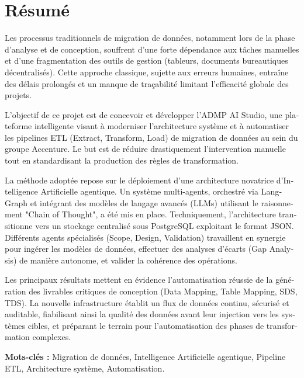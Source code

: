 \section*{Résumé}


\begin{otherlanguage}{french}
Les processus traditionnels de migration de données, notamment lors de la phase d'analyse et de conception, souffrent d'une forte dépendance aux tâches manuelles et d'une fragmentation des outils de gestion (tableurs, documents bureautiques décentralisés). Cette approche classique, sujette aux erreurs humaines, entraîne des délais prolongés et un manque de traçabilité limitant l'efficacité globale des projets.

L'objectif de ce projet est de concevoir et développer l'ADMP AI Studio, une plateforme intelligente visant à moderniser l'architecture système et à automatiser les pipelines ETL (Extract, Transform, Load) de migration de données au sein du groupe Accenture. Le but est de réduire drastiquement l'intervention manuelle tout en standardisant la production des règles de transformation.

La méthode adoptée repose sur le déploiement d'une architecture novatrice d'Intelligence Artificielle agentique. Un système multi-agents, orchestré via LangGraph et intégrant des modèles de langage avancés (LLMs) utilisant le raisonnement "Chain of Thought", a été mis en place. Techniquement, l'architecture transitionne vers un stockage centralisé sous PostgreSQL exploitant le format JSON. Différents agents spécialisés (Scope, Design, Validation) travaillent en synergie pour ingérer les modèles de données, effectuer des analyses d'écarts (Gap Analysis) de manière autonome, et valider la cohérence des opérations.

Les principaux résultats mettent en évidence l'automatisation réussie de la génération des livrables critiques de conception (Data Mapping, Table Mapping, SDS, TDS). La nouvelle infrastructure établit un flux de données continu, sécurisé et auditable, fiabilisant ainsi la qualité des données avant leur injection vers les systèmes cibles, et préparant le terrain pour l'automatisation des phases de transformation complexes.


\end{otherlanguage}


\vspace{1em}
\noindent\textbf{Mots-clés :} Migration de données, Intelligence Artificielle agentique, Pipeline ETL, Architecture système, Automatisation.
